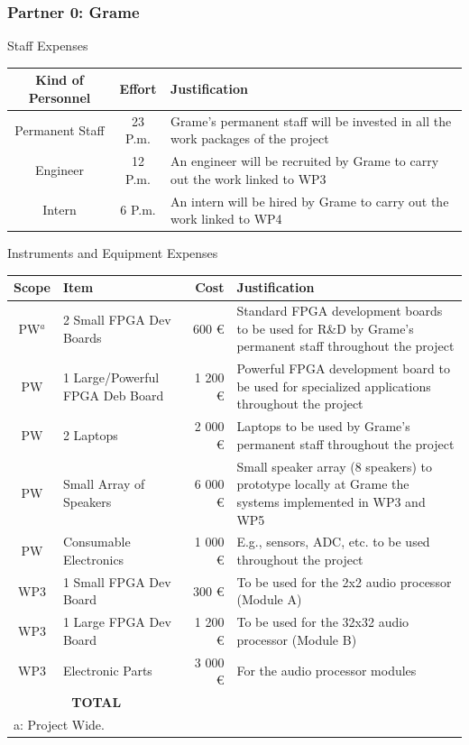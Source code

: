\documentclass[a4paper,9pt]{extarticle}
\newcommand{\secfont}{\noindent\color{ANRblue}\normalfont\sffamily}
\begin{document}
\subsubsection{Partner 0: Grame}

{\secfont Staff Expenses}

\noindent
\begin{center}
\begin{tabular}{c | c | p{10cm}}
\textbf{Kind of Personnel} & \textbf{Effort} & \textbf{Justification}\\
\hline
\hline
Permanent Staff & 23 P.m. & Grame's permanent staff will be invested in all the work packages of the project\\
Engineer & 12 P.m. & An engineer will be recruited by Grame to carry out the work linked to WP3\\
Intern & 6 P.m. & An intern will be hired by Grame to carry out the work linked to WP4
\end{tabular}
\end{center}

{\secfont Instruments and Equipment Expenses}

\noindent
\begin{center}
\begin{tabular}{c | p{3cm} | r | p{10cm}}
\textbf{Scope} & \textbf{Item} & \textbf{Cost} & \textbf{Justification}\\
\hline
\hline
PW$^a$ & 2 Small FPGA Dev Boards & 600 \euro{} & Standard FPGA development boards to be used for R\&D by Grame's permanent staff throughout the project\\
\hline
PW & 1 Large/Powerful FPGA Deb Board & 1 200 \euro{} & Powerful FPGA development board to be used for specialized applications throughout the project\\
\hline
PW & 2 Laptops & 2 000 \euro{} & Laptops to be used by Grame's permanent staff throughout the project\\
\hline
PW & Small Array of Speakers & 6 000 \euro{} & Small speaker array (8 speakers) to prototype locally at Grame the systems implemented in WP3 and WP5\\
\hline
PW & Consumable Electronics & 1 000 \euro{} & E.g., sensors, ADC, etc. to be used throughout the project\\
\hline
WP3 & 1 Small FPGA Dev Board & 300 \euro{} & To be used for the 2x2 audio processor (Module A)\\
\hline
WP3 & 1 Large FPGA Dev Board & 1 200 \euro{} & To be used for the 32x32 audio processor (Module B)\\
\hline
WP3 & Electronic Parts & 3 000 \euro{} & For the audio processor modules\\
\hline
\hline
\multicolumn{2}{c}{\textbf{TOTAL}} 15 300 \euro{} \\
\hline
\multicolumn{4}{l}{a: Project Wide.}
\end{tabular}
\end{center}
\end{document}
